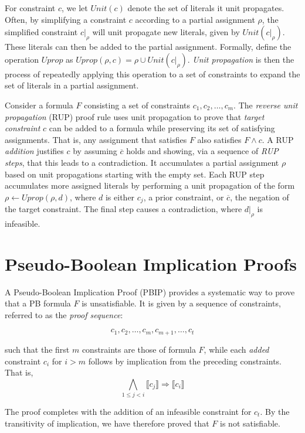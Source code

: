 \documentclass{fmcad}
\begin{document}
For constraint $c$, we let $Unit(c)$ denote the set of literals it unit propagates. Often, by
simplifying a constraint $c$ according to a partial assignment $\rho$, the simplified constraint
$c|_\rho$ will unit propagate new literals, given by $Unit(c|_\rho)$. These literals can then be
added to the partial assignment. Formally, define the operation $Uprop$ as
$Uprop(\rho, c) = \rho \cup Unit(c|_\rho)$. \textit{Unit propagation} is then the process of
repeatedly applying this operation to a set of constraints to expand the set of literals in a
partial assignment.

Consider a formula $F$ consisting a set of constraints $c_1, c_2, \dots, c_m$. The \textit{reverse
  unit propagation} (RUP) proof rule \cite{gocht_phd_2022} uses unit propagation to prove
that \textit{target constraint} $c$ can be added to a formula while preserving its set of
satisfying assignments. That is, any assignment that satisfies $F$ also satisfies $F \land c$.
A RUP \textit{addition} justifies $c$ by assuming $\overline{c}$ holds and showing, via a sequence
of \textit{RUP steps}, that this leads to a contradiction. It accumulates a partial assignment
$\rho$ based on unit propagations starting with the empty set. Each RUP step accumulates more
assigned literals by performing a unit propagation of the form $\rho \leftarrow Uprop(\rho, d)$,
where $d$ is either $c_j$, a prior constraint, or $\overline{c}$, the negation of the target
constraint. The final step causes a contradiction, where $d|_\rho$ is infeasible.

\section{Pseudo-Boolean Implication Proofs}
A Pseudo-Boolean Implication Proof (PBIP) provides a systematic way to prove that a PB formula $F$
is unsatisfiable. It is given by a sequence of constraints, referred to as the
\textit{proof sequence}:

\[
  c_1, c_2, \dots, c_m, c_{m + 1}, \dots, c_t
\]

such that the first $m$ constraints are those of formula $F$, while each \textit{added} constraint
$c_i$ for $i > m$ follows by implication from the preceding constraints. That is,
\begin{equation}
  \label{eq:clausal-impl}
  \bigwedge_{1 \leq j < i} \llbracket c_j \rrbracket \Rightarrow \llbracket c_i \rrbracket
\end{equation}

The proof completes with the addition of an infeasible constraint for $c_t$. By the transitivity
of implication, we have therefore proved that $F$ is not satisfiable.
\end{document}
